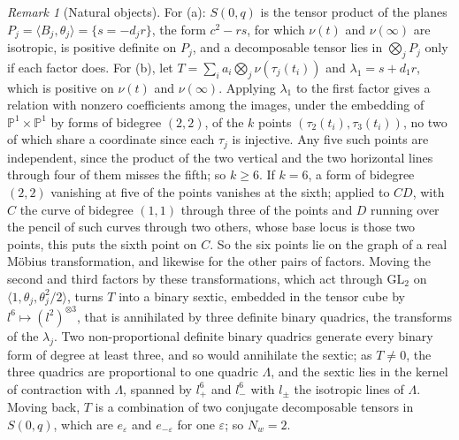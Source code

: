 \documentclass[11pt,reqno]{amsart}
\theoremstyle{plain}
\theoremstyle{definition}
\theoremstyle{remark}
\newtheorem{remark}[theorem]{Remark}
\newcommand{\PP}{\mathbb{P}}
\begin{document}
\begin{remark}[Natural objects]
For (a): $S(0,q)$ is the tensor product of the planes
$P_{j}=\langle B_{j},\theta_{j}\rangle=\{s=-d_{j}r\}$, the form $c^{2}-rs$, for
which $\nu(t)$ and $\nu(\infty)$ are isotropic, is positive definite on
$P_{j}$, and a decomposable tensor lies in $\bigotimes_{j}P_{j}$ only if each
factor does. For (b), let $T=\sum_{i}a_{i}\bigotimes_{j}\nu(\tau_{j}(t_{i}))$
and $\lambda_{1}=s+d_{1}r$, which is positive on $\nu(t)$ and $\nu(\infty)$.
Applying $\lambda_{1}$ to the first factor gives a relation with nonzero
coefficients among the images, under the embedding of
$\PP^{1}\times\PP^{1}$ by forms of bidegree $(2,2)$, of the $k$ points
$(\tau_{2}(t_{i}),\tau_{3}(t_{i}))$, no two of which share a coordinate since
each $\tau_{j}$ is injective. Any five such points are independent, since the
product of the two vertical and the two horizontal lines through four of them
misses the fifth; so $k\ge6$. If $k=6$, a form of bidegree $(2,2)$ vanishing
at five of the points vanishes at the sixth; applied to $CD$, with $C$ the
curve of bidegree $(1,1)$ through three of the points and $D$ running over
the pencil of such curves through two others, whose base locus is those two
points, this puts the sixth point on $C$. So the six points lie on the graph
of a real M\"obius transformation, and likewise for the other pairs of
factors. Moving the second and third factors by these transformations, which
act through $\mathrm{GL}_{2}$ on $\langle1,\theta_{j},\theta_{j}^{2}/2\rangle$,
turns $T$ into a binary sextic, embedded in the tensor cube by
$l^{6}\mapsto(l^{2})^{\otimes3}$, that is annihilated by three definite
binary quadrics, the transforms of the $\lambda_{j}$. Two non-proportional
definite binary quadrics generate every binary form of degree at least three,
and so would annihilate the sextic; as $T\ne0$, the three quadrics are
proportional to one quadric $\Lambda$, and the sextic lies in the kernel of
contraction with $\Lambda$, spanned by $l_{+}^{6}$ and $l_{-}^{6}$ with
$l_{\pm}$ the isotropic lines of $\Lambda$. Moving back, $T$
is a combination of two conjugate decomposable tensors in $S(0,q)$, which are
$e_{\varepsilon}$ and $e_{-\varepsilon}$ for one $\varepsilon$; so
$N_{w}=2$.
\end{remark}

\newcommand{\zenodoCodeID}{10.5281/zenodo.23225483}
\newcommand{\zenodoCodeDOI}{%
  \href{https://doi.org/\zenodoCodeID}{\texttt{\zenodoCodeID}}}
\end{document}
